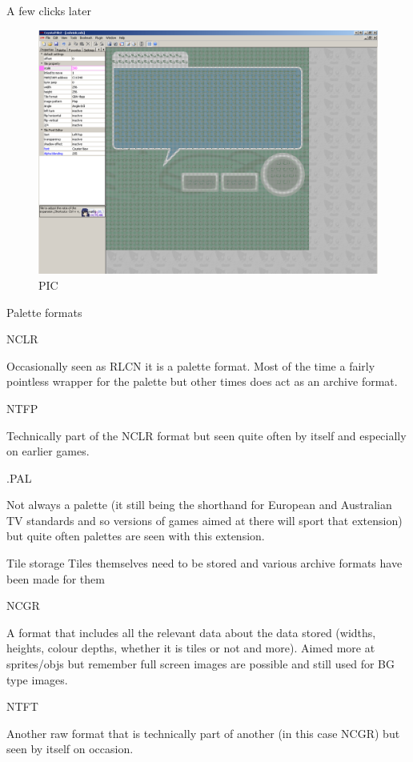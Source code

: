 \documentclass[
]{book}
\begin{document}
A few clicks later

\begin{figure}
\centering
\includegraphics{images/55_home_fast6191_romhackingguide_unrenamed_file___ginal_borders_7wizardozndsdemohack15jul2011.png}
\caption{PIC}
\end{figure}

Palette formats

NCLR

Occasionally seen as RLCN it is a palette format. Most of the time a fairly pointless wrapper for the palette but other times does act as an archive format.

NTFP

Technically part of the NCLR format but seen quite often by itself and especially on earlier games.

.PAL

Not always a palette (it still being the shorthand for European and Australian TV standards and so versions of games aimed at there will sport that extension) but quite often palettes are seen with this extension.

Tile storage Tiles themselves need to be stored and various archive formats have been made for them

NCGR

A format that includes all the relevant data about the data stored (widths, heights, colour depths, whether it is tiles or not and more). Aimed more at sprites/objs but remember full screen images are possible and still used for BG type images.

NTFT

Another raw format that is technically part of another (in this case NCGR) but seen by itself on occasion.
\end{document}
